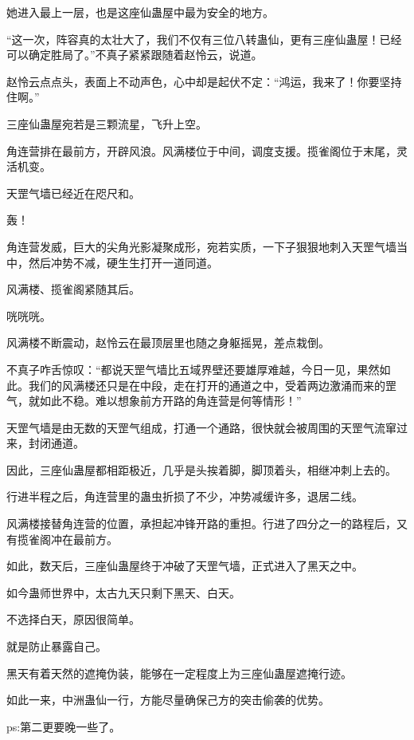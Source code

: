 \begin{this_body}
她进入最上一层，也是这座仙蛊屋中最为安全的地方。

“这一次，阵容真的太壮大了，我们不仅有三位八转蛊仙，更有三座仙蛊屋！已经可以确定胜局了。”不真子紧紧跟随着赵怜云，说道。

赵怜云点点头，表面上不动声色，心中却是起伏不定：“鸿运，我来了！你要坚持住啊。”

三座仙蛊屋宛若是三颗流星，飞升上空。

角连营排在最前方，开辟风浪。风满楼位于中间，调度支援。揽雀阁位于末尾，灵活机变。

天罡气墙已经近在咫尺和。

轰！

角连营发威，巨大的尖角光影凝聚成形，宛若实质，一下子狠狠地刺入天罡气墙当中，然后冲势不减，硬生生打开一道同道。

风满楼、揽雀阁紧随其后。

咣咣咣。

风满楼不断震动，赵怜云在最顶层里也随之身躯摇晃，差点栽倒。

不真子咋舌惊叹：“都说天罡气墙比五域界壁还要雄厚难越，今日一见，果然如此。我们的风满楼还只是在中段，走在打开的通道之中，受着两边激涌而来的罡气，就如此不稳。难以想象前方开路的角连营是何等情形！”

天罡气墙是由无数的天罡气组成，打通一个通路，很快就会被周围的天罡气流窜过来，封闭通道。

因此，三座仙蛊屋都相距极近，几乎是头挨着脚，脚顶着头，相继冲刺上去的。

行进半程之后，角连营里的蛊虫折损了不少，冲势减缓许多，退居二线。

风满楼接替角连营的位置，承担起冲锋开路的重担。行进了四分之一的路程后，又有揽雀阁冲在最前方。

如此，数天后，三座仙蛊屋终于冲破了天罡气墙，正式进入了黑天之中。

如今蛊师世界中，太古九天只剩下黑天、白天。

不选择白天，原因很简单。

就是防止暴露自己。

黑天有着天然的遮掩伪装，能够在一定程度上为三座仙蛊屋遮掩行迹。

如此一来，中洲蛊仙一行，方能尽量确保己方的突击偷袭的优势。

ps:第二更要晚一些了。

\end{this_body}

